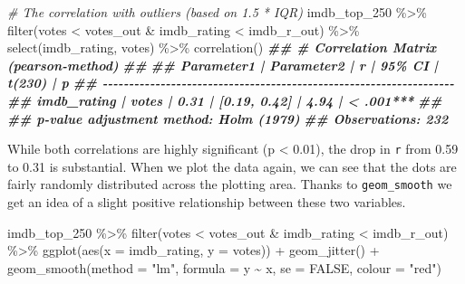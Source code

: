 \documentclass[
]{book}
\newenvironment{Shaded}{\begin{snugshade}}{\end{snugshade}}
\newcommand{\AttributeTok}[1]{\textcolor[rgb]{0.77,0.63,0.00}{#1}}
\newcommand{\CommentTok}[1]{\textcolor[rgb]{0.56,0.35,0.01}{\textit{#1}}}
\newcommand{\ConstantTok}[1]{\textcolor[rgb]{0.00,0.00,0.00}{#1}}
\newcommand{\DocumentationTok}[1]{\textcolor[rgb]{0.56,0.35,0.01}{\textbf{\textit{#1}}}}
\newcommand{\FunctionTok}[1]{\textcolor[rgb]{0.00,0.00,0.00}{#1}}
\newcommand{\NormalTok}[1]{#1}
\newcommand{\SpecialCharTok}[1]{\textcolor[rgb]{0.00,0.00,0.00}{#1}}
\newcommand{\StringTok}[1]{\textcolor[rgb]{0.31,0.60,0.02}{#1}}
\begin{document}
\begin{Shaded}
\begin{Highlighting}[]
\CommentTok{\# The correlation with outliers (based on 1.5 * IQR)}
\NormalTok{imdb\_top\_250 }\SpecialCharTok{\%\textgreater{}\%}
  \FunctionTok{filter}\NormalTok{(votes }\SpecialCharTok{\textless{}}\NormalTok{  votes\_out }\SpecialCharTok{\&}\NormalTok{ imdb\_rating }\SpecialCharTok{\textless{}}\NormalTok{ imdb\_r\_out) }\SpecialCharTok{\%\textgreater{}\%}
  \FunctionTok{select}\NormalTok{(imdb\_rating, votes) }\SpecialCharTok{\%\textgreater{}\%} 
  \FunctionTok{correlation}\NormalTok{()}
\DocumentationTok{\#\# \# Correlation Matrix (pearson{-}method)}
\DocumentationTok{\#\# }
\DocumentationTok{\#\# Parameter1  | Parameter2 |    r |       95\% CI | t(230) |         p}
\DocumentationTok{\#\# {-}{-}{-}{-}{-}{-}{-}{-}{-}{-}{-}{-}{-}{-}{-}{-}{-}{-}{-}{-}{-}{-}{-}{-}{-}{-}{-}{-}{-}{-}{-}{-}{-}{-}{-}{-}{-}{-}{-}{-}{-}{-}{-}{-}{-}{-}{-}{-}{-}{-}{-}{-}{-}{-}{-}{-}{-}{-}{-}{-}{-}{-}{-}{-}{-}{-}{-}}
\DocumentationTok{\#\# imdb\_rating |      votes | 0.31 | [0.19, 0.42] |   4.94 | \textless{} .001***}
\DocumentationTok{\#\# }
\DocumentationTok{\#\# p{-}value adjustment method: Holm (1979)}
\DocumentationTok{\#\# Observations: 232}
\end{Highlighting}
\end{Shaded}

While both correlations are highly significant (p \textless{} 0.01), the drop in \texttt{r} from 0.59 to 0.31 is substantial. When we plot the data again, we can see that the dots are fairly randomly distributed across the plotting area. Thanks to \texttt{geom\_smooth} we get an idea of a slight positive relationship between these two variables.

\begin{Shaded}
\begin{Highlighting}[]
\NormalTok{imdb\_top\_250 }\SpecialCharTok{\%\textgreater{}\%}
  \FunctionTok{filter}\NormalTok{(votes }\SpecialCharTok{\textless{}}\NormalTok{  votes\_out }\SpecialCharTok{\&}\NormalTok{ imdb\_rating }\SpecialCharTok{\textless{}}\NormalTok{ imdb\_r\_out) }\SpecialCharTok{\%\textgreater{}\%}
  \FunctionTok{ggplot}\NormalTok{(}\FunctionTok{aes}\NormalTok{(}\AttributeTok{x =}\NormalTok{ imdb\_rating, }\AttributeTok{y =}\NormalTok{ votes)) }\SpecialCharTok{+} 
  \FunctionTok{geom\_jitter}\NormalTok{() }\SpecialCharTok{+}
  \FunctionTok{geom\_smooth}\NormalTok{(}\AttributeTok{method =} \StringTok{"lm"}\NormalTok{,}
              \AttributeTok{formula =}\NormalTok{ y }\SpecialCharTok{\textasciitilde{}}\NormalTok{ x,}
              \AttributeTok{se =} \ConstantTok{FALSE}\NormalTok{,}
              \AttributeTok{colour =} \StringTok{"red"}\NormalTok{)}
\end{Highlighting}
\end{Shaded}
\end{document}
